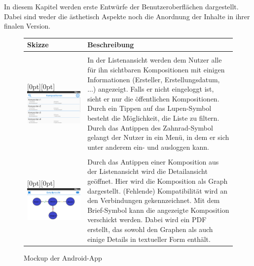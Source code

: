 In diesem Kapitel werden erste Entwürfe der Benutzeroberflächen dargestellt. Dabei sind weder die ästhetisch Aspekte noch die Anordnung der Inhalte in ihrer finalen Version. 

\begin{figure}[h]
	\centering
	
	\begin{tabularx}{\textwidth}{ p{} | X }
		\textbf{Skizze} & \textbf{Beschreibung} 
		
		\\ \hline \\
		
		\raisebox{-.9\height}[0pt][0pt]{\includegraphics[width=.5\textwidth]{img/mockup_list}}
		\label{fig:mock-list} 
		
		&In der Listenansicht werden dem Nutzer alle für ihn sichtbaren Kompositionen mit einigen Informationen (Ersteller, Erstellungsdatum, ...) angezeigt. Falls er nicht eingeloggt ist, sieht er nur die öffentlichen Kompositionen. Durch ein Tippen auf das Lupen-Symbol besteht die Möglichkeit, die Liste zu filtern. Durch das Antippen des Zahnrad-Symbol gelangt der Nutzer in ein Menü, in dem er sich unter anderem ein- und ausloggen kann.
				
		\\ \hline \\
		\raisebox{-.9\height}[0pt][0pt]{\includegraphics[width=.5\textwidth]{img/mockup_detail}}
		\label{fig:mock-detail} 
		
		& 
		Durch das Antippen einer Komposition aus der Listenansicht wird die Detailansicht geöffnet. Hier wird die Komposition als Graph dargestellt. (Fehlende) Kompatibilität wird an den Verbindungen gekennzeichnet. Mit dem Brief-Symbol kann die angezeigte Komposition verschickt werden.  Dabei wird ein PDF erstellt, das sowohl den Graphen als auch einige Details in textueller Form enthält. 
		
	\end{tabularx}
	
	\caption{Mockup der Android-App}
	\label{fig:app-mockup}
\end{figure}

